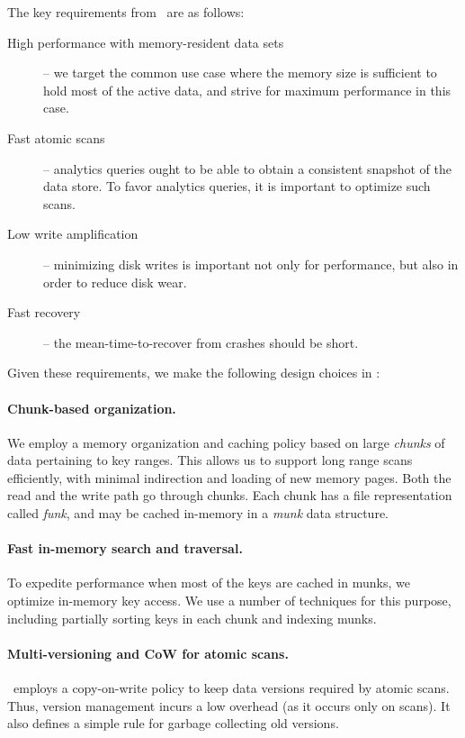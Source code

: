 


The key requirements from \sys\ are as follows:
\begin{description}
\item[High performance with memory-resident data sets] -- we target the common 
use case where the memory size is sufficient to hold most of the active data, and strive for 
maximum performance in this case.  
 \item[Fast atomic scans] -- analytics queries ought to be able to obtain a consistent snapshot of the data store. To favor analytics queries, it is important to optimize  such scans. 
 \item[Low write amplification] -- minimizing disk writes is important not only for performance, but also in order to reduce disk wear.
\item[Fast recovery] --  the mean-time-to-recover from crashes should be short.
\end{description} 



Given these requirements, we make the following design choices in \sys:
\paragraph{Chunk-based organization.} We employ a memory organization and caching policy based on large \emph{chunks} of data pertaining to key ranges.  This allows us to support 
long range scans efficiently, with minimal indirection and loading of new memory pages. 
Both the read and the write path go through chunks. 
Each chunk has a file representation called  \emph{funk}, and may be cached 
in-memory in a  \emph{munk} data structure.
\paragraph{Fast in-memory search and traversal.} To expedite performance when 
most of the keys are cached in munks, 
we  optimize in-memory key access. We use a number of techniques for this purpose, including partially sorting keys in each chunk and 
indexing munks.
\paragraph{Multi-versioning and CoW for atomic scans.} \sys\ employs a copy-on-write policy to keep data versions required by atomic scans.
Thus, version management incurs a low overhead (as it occurs only on scans). It also defines a simple rule for garbage collecting old versions.
